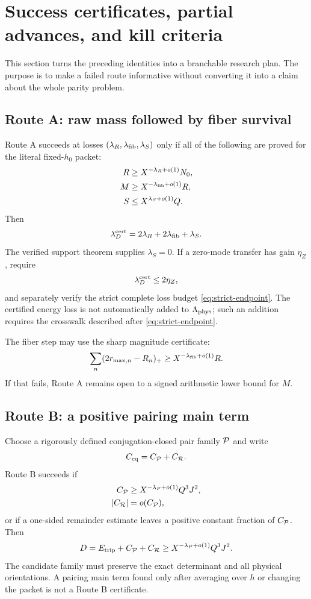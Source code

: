 \section{Success certificates, partial advances, and kill criteria}
\label{sec:decision-rules}

This section turns the preceding identities into a branchable
research plan.  The purpose is to make a failed route informative
without converting it into a claim about the whole parity problem.

\subsection{Route A: raw mass followed by fiber survival}

Route A succeeds at losses
\((\lambda_R,\lambda_{\rm fib},\lambda_S)\) only if all of the
following are proved for the literal fixed-\(h_0\) packet:
\begin{align}
 R&\ge X^{-\lambda_R+o(1)}N_0,
\label{eq:routeA-raw}\\
 M&\ge X^{-\lambda_{\rm fib}+o(1)}R,
\label{eq:routeA-fiber}\\
 S&\le X^{\lambda_S+o(1)}Q.
\label{eq:routeA-support}
\end{align}
Then
\[
 \lambda_D^{\rm cert}
 =2\lambda_R+2\lambda_{\rm fib}+\lambda_S.
\]
The verified support theorem supplies \(\lambda_S=0\).  If a
zero-mode transfer has gain \(\eta_Z\), require
\[
 \lambda_D^{\rm cert}\le2\eta_Z,
\]
and separately verify the strict complete loss budget
\eqref{eq:strict-endpoint}.  The certified energy loss is not
automatically added to \(\Lambda_{\rm phys}\); such an addition
requires the crosswalk described after
\eqref{eq:strict-endpoint}.

The fiber step may use the sharp magnitude certificate:
\[
 \sum_n(2r_{\max,n}-R_n)_+
 \ge X^{-\lambda_{\rm fib}+o(1)}R.
\]
If that fails, Route A remains open to a signed arithmetic lower
bound for \(M\).

\subsection{Route B: a positive pairing main term}

Choose a rigorously defined conjugation-closed pair family \(\mathcal P\)
and write
\[
 C_{\mathrm{eq}}=C_{\mathcal P}+C_{\mathcal R}.
\]
Route B succeeds if
\begin{align}
 C_{\mathcal P}
 &\ge X^{-\lambda_P+o(1)}Q^3J^2,
\label{eq:routeB-main}\\
 |C_{\mathcal R}|
 &=o(C_{\mathcal P}),
\label{eq:routeB-rem}
\end{align}
or if a one-sided remainder estimate leaves a positive constant
fraction of \(C_{\mathcal P}\).  Then
\[
 D=E_{\mathrm{trip}}+C_{\mathcal P}+C_{\mathcal R}
\ge X^{-\lambda_P+o(1)}Q^3J^2.
\]
The candidate family must preserve the exact determinant and all
physical orientations.  A pairing main term found only after
averaging over \(h\) or changing the packet is not a Route B
certificate.

